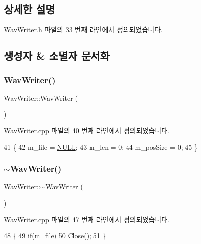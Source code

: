 \subsection{상세한 설명}


Wav\+Writer.\+h 파일의 33 번째 라인에서 정의되었습니다.



\subsection{생성자 \& 소멸자 문서화}
\mbox{\label{class_wav_writer_ada0f985bd68570f6d55442f96f3bda44}} 
\subsubsection{\texorpdfstring{Wav\+Writer()}{WavWriter()}}
{\footnotesize\ttfamily Wav\+Writer\+::\+Wav\+Writer (\begin{DoxyParamCaption}{ }\end{DoxyParamCaption})}



Wav\+Writer.\+cpp 파일의 40 번째 라인에서 정의되었습니다.


\begin{DoxyCode}
41 \{
42   m\_file = \mbox{\hyperlink{getopt1_8c_a070d2ce7b6bb7e5c05602aa8c308d0c4}{NULL}};
43   m\_len = 0;
44   m\_posSize = 0;
45 \}
\end{DoxyCode}
\mbox{\label{class_wav_writer_a53a03ef60fc6635381d059beaa6f0657}} 
\subsubsection{\texorpdfstring{$\sim$\+Wav\+Writer()}{~WavWriter()}}
{\footnotesize\ttfamily Wav\+Writer\+::$\sim$\+Wav\+Writer (\begin{DoxyParamCaption}{ }\end{DoxyParamCaption})}



Wav\+Writer.\+cpp 파일의 47 번째 라인에서 정의되었습니다.


\begin{DoxyCode}
48 \{
49   \textcolor{keywordflow}{if}(m\_file)
50     Close();
51 \}
\end{DoxyCode}


